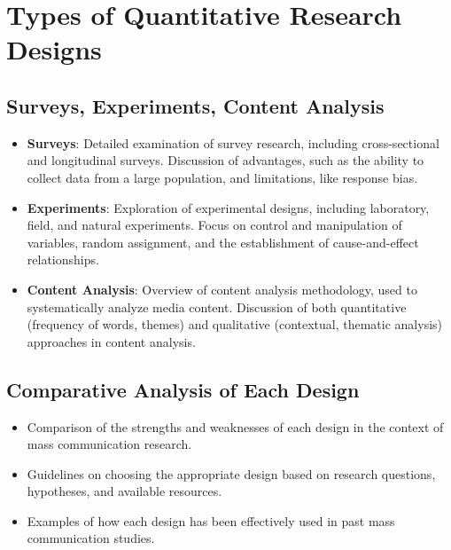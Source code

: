 \documentclass[
]{book}
\begin{document}
\hypertarget{types-of-quantitative-research-designs}{%
\section*{Types of Quantitative Research Designs}\label{types-of-quantitative-research-designs}}

\hypertarget{surveys-experiments-content-analysis}{%
\subsection*{Surveys, Experiments, Content Analysis}\label{surveys-experiments-content-analysis}}

\begin{itemize}
\item
  \textbf{Surveys}: Detailed examination of survey research, including cross-sectional and longitudinal surveys. Discussion of advantages, such as the ability to collect data from a large population, and limitations, like response bias.
\item
  \textbf{Experiments}: Exploration of experimental designs, including laboratory, field, and natural experiments. Focus on control and manipulation of variables, random assignment, and the establishment of cause-and-effect relationships.
\item
  \textbf{Content Analysis}: Overview of content analysis methodology, used to systematically analyze media content. Discussion of both quantitative (frequency of words, themes) and qualitative (contextual, thematic analysis) approaches in content analysis.
\end{itemize}

\hypertarget{comparative-analysis-of-each-design}{%
\subsection*{Comparative Analysis of Each Design}\label{comparative-analysis-of-each-design}}

\begin{itemize}
\item
  Comparison of the strengths and weaknesses of each design in the context of mass communication research.
\item
  Guidelines on choosing the appropriate design based on research questions, hypotheses, and available resources.
\item
  Examples of how each design has been effectively used in past mass communication studies.
\end{itemize}
\end{document}
